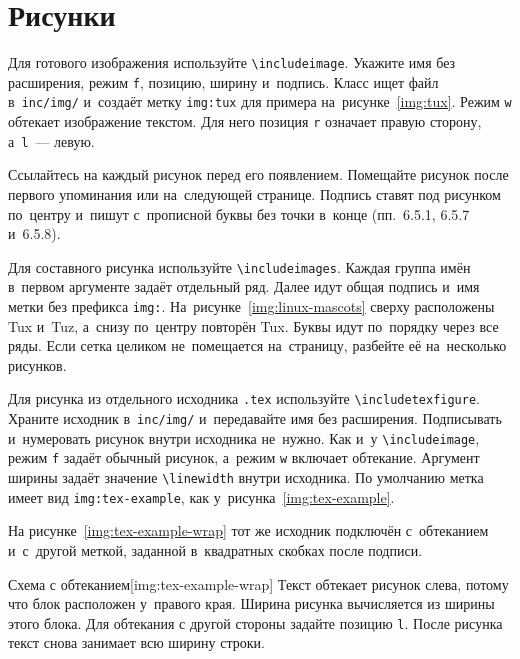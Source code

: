 \documentclass{bmstu}
\begin{document}
\section{Рисунки}

Для готового изображения используйте \verb|\includeimage|.
Укажите имя без расширения, режим \texttt{f}, позицию, ширину и~подпись.
Класс ищет файл в~\texttt{inc/img/} и~создаёт метку \texttt{img:tux} для примера на~рисунке~\ref{img:tux}.
Режим \texttt{w} обтекает изображение текстом.
Для него позиция \texttt{r} означает правую сторону, а~\texttt{l}~--- левую.


Ссылайтесь на каждый рисунок перед его появлением.
Помещайте рисунок после первого упоминания или на~следующей странице.
Подпись ставят под рисунком по~центру и~пишут с~прописной буквы без точки в~конце (пп.~6.5.1, 6.5.7 и~6.5.8).

Для составного рисунка используйте \verb|\includeimages|.
Каждая группа имён в~первом аргументе задаёт отдельный ряд.
Далее идут общая подпись и~имя метки без префикса \texttt{img:}.
На~рисунке~\ref{img:linux-mascots} сверху расположены Tux и~Tuz, а~снизу по~центру повторён Tux.
Буквы идут по~порядку через все ряды.
Если сетка целиком не~помещается на~страницу, разбейте её на~несколько рисунков.


Для рисунка из отдельного исходника \texttt{.tex} используйте \verb|\includetexfigure|.
Храните исходник в~\texttt{inc/img/} и~передавайте имя без расширения.
Подписывать и~нумеровать рисунок внутри исходника не~нужно.
Как и~у \verb|\includeimage|, режим \texttt{f} задаёт обычный рисунок, а~режим \texttt{w} включает обтекание.
Аргумент ширины задаёт значение \verb|\linewidth| внутри исходника.
По умолчанию метка имеет вид \texttt{img:tex-example}, как у~рисунка~\ref{img:tex-example}.


На рисунке~\ref{img:tex-example-wrap} тот же исходник подключён с~обтеканием и~с~другой меткой, заданной в~квадратных скобках после подписи.

    {Схема с обтеканием}[img:tex-example-wrap]
Текст обтекает рисунок слева, потому что блок расположен у~правого края.
Ширина рисунка вычисляется из ширины этого блока.
Для обтекания с другой стороны задайте позицию \texttt{l}.
После рисунка текст снова занимает всю ширину строки.
\end{document}
